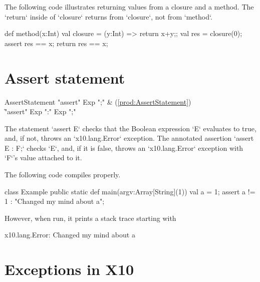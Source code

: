 \begin{ex}
The following code illustrates returning values from a closure and a method.
The \xcd`return` inside of \xcd`closure` returns from \xcd`closure`, not from
\xcd`method`.  
\begin{xten}
def method(x:Int) {
  val closure = (y:Int) => {return x+y;}; 
  val res = closure(0);
  assert res == x;
  return res == x;
}
\end{xten}


\end{ex}


\section{Assert statement} 

\begin{bbgrammar}
     AssertStatement \: \xcd"assert" Exp \xcd";" & (\ref{prod:AssertStatement}) \\
                    \| \xcd"assert" Exp  \xcd":" Exp  \xcd";" \\
\end{bbgrammar}

The statement \xcd`assert E` checks that the Boolean expression \xcd`E`
evaluates to true, and, if not, throws an \xcd`x10.lang.Error`  exception.  
The annotated assertion \xcd`assert E : F;` checks \xcd`E`, and, if it is
false, throws an \xcd`x10.lang.Error` exception with \xcd`F`'s value attached
to it. 

\begin{ex}
The following code compiles properly.  
% 
\begin{xten}
class Example {
  public static def main(argv:Array[String](1)) {
    val a = 1;
    assert a != 1 : "Changed my mind about a";
  }
}
\end{xten}
\noindent
However, when run, it 
prints a stack trace starting with 
\begin{xten}
x10.lang.Error: Changed my mind about a
\end{xten}
\end{ex}

\section{Exceptions in X10}

